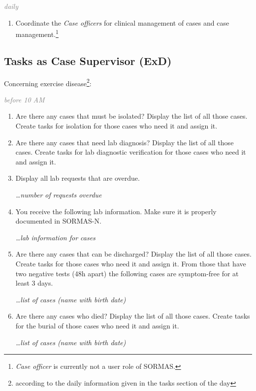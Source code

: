 \documentclass[a4paper, titlepage]{tufte-handout}
\begin{document}
\emph{\textcolor{gray}{daily}}

\begin{enumerate}
\item Coordinate the \emph{Case officers} for clinical management of cases and case management.\footnote{\emph{Case officer} is currently not a user role of SORMAS.}
\end{enumerate}

\subsection{Tasks as Case Supervisor (ExD)}
\label{sec-7-2}

Concerning exercise disease\footnote{according to the daily information given in the tasks section of the day

\newpage}:

\emph{\textcolor{gray}{before 10 AM}}

\begin{enumerate}
\item Are there any cases that must be isolated? Display the list of all those cases. Create tasks for isolation for those cases who need it and assign it.

\item Are there any cases that need lab diagnosis? Display the list of all those cases. Create tasks for lab diagnostic verification for those cases who need it and assign it.

\item Display all lab requests that are overdue.

\emph{\ldots number of requests overdue}

\item You receive the following lab information. Make sure it is properly documented in SORMAS-N.

\emph{\ldots lab information for cases}

\item Are there any cases that can be discharged? Display the list of all those cases. Create tasks for those cases who need it and assign it.
From those that have two negative tests (48h apart) the following cases are symptom-free for at least 3 days. 

\emph{\ldots list of cases (name with birth date)}

\item Are there any cases who died? Display the list of all those cases. Create tasks for the burial of those cases who need it and assign it.

\emph{\ldots list of cases (name with birth date)}
\end{enumerate}
\end{document}
